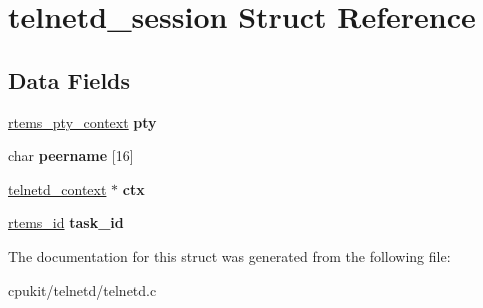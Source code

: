 \hypertarget{structtelnetd__session}{}\section{telnetd\+\_\+session Struct Reference}
\label{structtelnetd__session}
\subsection*{Data Fields}
\begin{DoxyCompactItemize}
\item 
\mbox{\label{structtelnetd__session_a9744e03f00180cbf4e01a41c3e9983f0}} 
\mbox{\hyperlink{structrtems__pty__context}{rtems\+\_\+pty\+\_\+context}} {\bfseries pty}
\item 
\mbox{\label{structtelnetd__session_ae5a4345c1f615e8865468af744998b76}} 
char {\bfseries peername} \mbox{[}16\mbox{]}
\item 
\mbox{\label{structtelnetd__session_a33baad627dc2b98664e252af829c7039}} 
\mbox{\hyperlink{structtelnetd__context}{telnetd\+\_\+context}} $\ast$ {\bfseries ctx}
\item 
\mbox{\label{structtelnetd__session_a7f425f88dda4614265e99bb970f59761}} 
\mbox{\hyperlink{group__ClassicTasks_gab20892b814dced7dd4e5b9bf42becd57}{rtems\+\_\+id}} {\bfseries task\+\_\+id}
\end{DoxyCompactItemize}


The documentation for this struct was generated from the following file\+:\begin{DoxyCompactItemize}
\item 
cpukit/telnetd/telnetd.\+c\end{DoxyCompactItemize}
